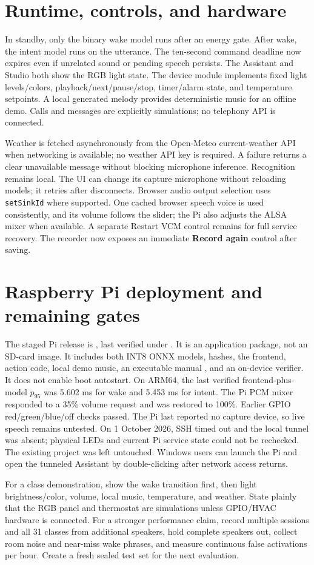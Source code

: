\documentclass[11pt,a4paper]{article}
\begin{document}
\section{Runtime, controls, and hardware}
In standby, only the binary wake model runs after an energy gate. After wake, the intent model runs on the utterance. The ten-second command deadline now expires even if unrelated sound or pending speech persists. The Assistant and Studio both show the RGB light state. The device module implements fixed light levels/colors, playback/next/pause/stop, timer/alarm state, and temperature setpoints. A local generated melody provides deterministic music for an offline demo. Calls and messages are explicitly simulations; no telephony API is connected.

Weather is fetched asynchronously from the Open-Meteo current-weather API when networking is available; no weather API key is required. A failure returns a clear unavailable message without blocking microphone inference. Recognition remains local. The UI can change its capture microphone without reloading models; it retries after disconnects. Browser audio output selection uses \texttt{setSinkId} where supported. One cached browser speech voice is used consistently, and its volume follows the slider; the Pi also adjusts the ALSA mixer when available. A separate Restart VCM control remains for full service recovery. The recorder now exposes an immediate \textbf{Record again} control after saving.

\section{Raspberry Pi deployment and remaining gates}
The staged Pi release is , last verified under . It is an application package, not an SD-card image. It includes both INT8 ONNX models, hashes, the frontend, action code, local demo music, an executable manual , and an on-device verifier. It does not enable boot autostart. On ARM64, the last verified frontend-plus-model $p_{95}$ was 5.602 ms for wake and 5.453 ms for intent. The Pi PCM mixer responded to a 35\% volume request and was restored to 100\%. Earlier GPIO red/green/blue/off checks passed. The Pi last reported no capture device, so live speech remains untested. On 1 October 2026, SSH timed out and the local tunnel was absent; physical LEDs and current Pi service state could not be rechecked. The existing  project was left untouched. Windows users can launch the Pi and open the tunneled Assistant by double-clicking  after network access returns.

For a class demonstration, show the wake transition first, then light brightness/color, volume, local music, temperature, and weather. State plainly that the RGB panel and thermostat are simulations unless GPIO/HVAC hardware is connected. For a stronger performance claim, record multiple sessions and all 31 classes from additional speakers, hold complete speakers out, collect room noise and near-miss wake phrases, and measure continuous false activations per hour. Create a fresh sealed test set for the next evaluation.
\end{document}
